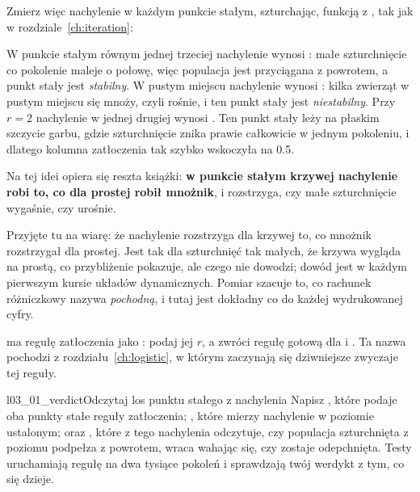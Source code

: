 \noindent
Zmierz więc nachylenie w każdym punkcie stałym, szturchając, funkcją
 z , tak jak w rozdziale~\ref{ch:iteration}:



\noindent
W punkcie stałym równym jednej trzeciej nachylenie wynosi
: małe szturchnięcie co pokolenie maleje o połowę, więc
populacja jest przyciągana z powrotem, a punkt stały jest \emph{stabilny}. W
pustym miejscu nachylenie wynosi : kilka zwierząt w
pustym miejscu się mnoży, czyli rośnie, i ten punkt stały jest
\emph{niestabilny}. Przy $r = 2$ nachylenie w jednej drugiej wynosi
. Ten punkt stały leży na płaskim szczycie garbu, gdzie
szturchnięcie znika prawie całkowicie w jednym pokoleniu, i dlatego kolumna
zatłoczenia tak szybko wskoczyła na \num{0.5}.

Na tej idei opiera się reszta książki: \textbf{w punkcie stałym krzywej
nachylenie robi to, co dla prostej robił mnożnik}, i rozstrzyga, czy małe
szturchnięcie wygaśnie, czy urośnie.

\begin{rigourbox}
Przyjęte tu na wiarę: że nachylenie rozstrzyga dla krzywej to, co mnożnik
rozstrzygał dla prostej. Jest tak dla szturchnięć tak małych, że krzywa
wygląda na prostą, co przybliżenie pokazuje, ale czego nie dowodzi; dowód
jest w każdym pierwszym kursie układów dynamicznych. Pomiar szacuje to, co
rachunek różniczkowy nazywa \emph{pochodną}, i tutaj jest dokładny co do
każdej wydrukowanej cyfry.
\end{rigourbox}

\begin{projectbox}
 ma regułę zatłoczenia jako : podaj jej $r$, a
zwróci regułę gotową dla  i . Ta nazwa pochodzi z
rozdziału~\ref{ch:logistic}, w którym zaczynają się dziwniejsze zwyczaje tej
reguły.
\end{projectbox}

\begin{lab}{l03_01_verdict}{Odczytaj los punktu stałego z nachylenia}
Napisz , które podaje oba punkty stałe reguły
zatłoczenia; , które mierzy nachylenie w poziomie
ustalonym; oraz , które z tego nachylenia odczytuje, czy
populacja szturchnięta z poziomu podpełza z powrotem, wraca wahając się, czy
zostaje odepchnięta. Testy uruchamiają regułę na dwa tysiące pokoleń i
sprawdzają twój werdykt z tym, co się dzieje.
\end{lab}


